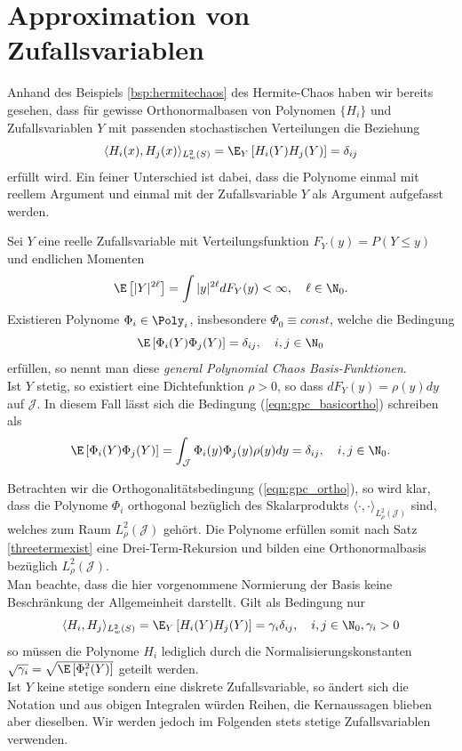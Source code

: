 \section{Approximation von Zufallsvariablen}
Anhand des Beispiels \ref{bsp:hermitechaos} des Hermite-Chaos haben wir bereits gesehen, dass für gewisse Orthonormalbasen von Polynomen $\lbrace H_i\rbrace$ und Zufallsvariablen $Y$ mit passenden stochastischen Verteilungen die Beziehung
\[\langle H_i(x),H_j(x)\rangle_{L_w^2(S)} =\E_Y \left[H_i(Y)H_j(Y)\right]=\delta_{ij}\]
erfüllt wird. Ein feiner Unterschied ist dabei, dass die Polynome einmal mit reellem Argument und einmal mit der Zufallsvariable $Y$ als Argument aufgefasst werden.
\begin{mathdef}
\label{def:gpc}
Sei $Y$ eine reelle Zufallsvariable mit Verteilungsfunktion $F_Y(y)=P(Y\le y)$ und endlichen Momenten
\[\E\left[|Y|^{2\ell}\right]=\int |y|^{2\ell}dF_Y(y)<\infty,\quad \ell\in \N_0.\]
Existieren Polynome $\Phi_i\in\Poly_i$, insbesondere $\Phi_0\equiv const$, welche die Bedingung
\begin{equation}
\label{eqn:gpc_basicortho}
\E\left[\Phi_i(Y)\Phi_j(Y)\right]=\delta_{ij},\quad i,j\in\N_0
\end{equation}
erfüllen, so nennt man diese \emph{general Polynomial Chaos Basis-Funktionen}.\\
Ist $Y$ stetig, so existiert eine Dichtefunktion $\rho>0$, so dass $dF_Y(y)=\rho(y)dy$ auf $\mathcal{\mathcal{J}}$. In diesem Fall lässt sich die Bedingung (\ref{eqn:gpc_basicortho}) schreiben als
\begin{equation}
\label{eqn:gpc_ortho}
\E\left[\Phi_i(Y)\Phi_j(Y)\right]=\int_\mathcal{\mathcal{J}} \Phi_i(y)\Phi_j(y)\rho(y)dy=\delta_{ij},\quad i,j\in\N_0.
\end{equation}
\end{mathdef}
\begin{mathbem}
Betrachten wir die Orthogonalitätsbedingung (\ref{eqn:gpc_ortho}), so wird klar, dass die Polynome $\Phi_i$ orthogonal bezüglich des Skalarprodukts $\langle \cdot,\cdot\rangle_{L_\rho^2(\mathcal{J})}$ sind, welches zum Raum $L_\rho^2(\mathcal{J})$ gehört. Die Polynome erfüllen somit nach Satz \ref{threetermexist} eine Drei-Term-Rekursion und bilden eine Orthonormalbasis bezüglich $L_\rho^2(\mathcal{\mathcal{J}})$.\\
Man beachte, dass die hier vorgenommene Normierung der Basis keine Beschränkung der Allgemeinheit darstellt. Gilt als Bedingung nur
\[\langle H_i,H_j\rangle_{L_w^2(S)} =\E_Y \left[H_i(Y)H_j(Y)\right]=\gamma_i\delta_{ij},\quad i,j\in\N_0,\gamma_i>0\]
so müssen die Polynome $H_i$ lediglich durch die Normalisierungskonstanten $\sqrt{\gamma_i}=\sqrt{\E\left[\Phi_i^2(Y)\right]}$ geteilt werden.\\
Ist $Y$ keine stetige sondern eine diskrete Zufallsvariable, so ändert sich die Notation und aus obigen Integralen würden Reihen, die Kernaussagen blieben aber dieselben. Wir werden jedoch im Folgenden stets stetige Zufallsvariablen verwenden.
\end{mathbem}
